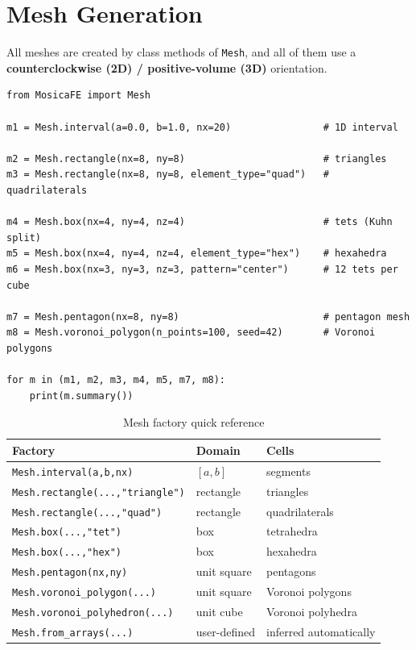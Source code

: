 \documentclass[11pt,oneside]{book}
\theoremstyle{definition}
\theoremstyle{plain}
\newcommand{\code}[1]{\texttt{#1}}
\begin{document}
\section{Mesh Generation}
\label{sec:mesh-generation}

All meshes are created by class methods of \code{Mesh}, and all of them use a
\textbf{counterclockwise (2D) / positive-volume (3D)} orientation.

\begin{lstlisting}[language=MosicaFE,caption={Generating the various mesh types},label={lst:meshgen}]
from MosicaFE import Mesh

m1 = Mesh.interval(a=0.0, b=1.0, nx=20)                # 1D interval

m2 = Mesh.rectangle(nx=8, ny=8)                        # triangles
m3 = Mesh.rectangle(nx=8, ny=8, element_type="quad")   # quadrilaterals

m4 = Mesh.box(nx=4, ny=4, nz=4)                        # tets (Kuhn split)
m5 = Mesh.box(nx=4, ny=4, nz=4, element_type="hex")    # hexahedra
m6 = Mesh.box(nx=3, ny=3, nz=3, pattern="center")      # 12 tets per cube

m7 = Mesh.pentagon(nx=8, ny=8)                         # pentagon mesh
m8 = Mesh.voronoi_polygon(n_points=100, seed=42)       # Voronoi polygons

for m in (m1, m2, m3, m4, m5, m7, m8):
    print(m.summary())
\end{lstlisting}

\begin{table}[htbp]
\centering
\caption{Mesh factory quick reference}
\label{tab:mesh-factories}
\begin{lrbox}{\guideTableBox}
\begin{tabular}{@{}L{6.4cm}L{1.9cm}L{6.3cm}@{}}
\toprule
Factory & Domain & Cells \\
\midrule
\code{Mesh.interval(a,\allowbreak b,\allowbreak nx)} & $[a,b]$ & segments \\
\code{Mesh.rectangle(...,\allowbreak "triangle")} & rectangle & triangles \\
\code{Mesh.rectangle(...,\allowbreak "quad")} & rectangle & quadrilaterals \\
\code{Mesh.box(...,\allowbreak "tet")} & box & tetrahedra \\
\code{Mesh.box(...,\allowbreak "hex")} & box & hexahedra \\
\code{Mesh.pentagon(nx,\allowbreak ny)} & unit square & pentagons \\
\code{Mesh.voronoi\_\allowbreak polygon(...)} & unit square & Voronoi polygons \\
\code{Mesh.voronoi\_\allowbreak polyhedron(...)} & unit cube & Voronoi polyhedra \\
\code{Mesh.from\_\allowbreak arrays(...)} & user-defined & inferred automatically \\
\bottomrule
\end{tabular}
\end{lrbox}%
\ifdim\wd\guideTableBox>\linewidth
  \resizebox{\linewidth}{!}{\usebox{\guideTableBox}}%
\else\usebox{\guideTableBox}\fi
\end{table}
\end{document}
